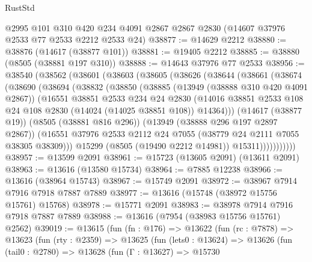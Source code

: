 \begin{lexlean}{RustStd}
\begin{coremodule}
    @2995
    @101
    @310
    @420
    @234
    @4091
    @2867
    @2867
    @2830
    (@14607 @37976 @2533 @77 @2533 @2212 @2533 @24)
@38877 := @14629 @2212
@38880 := @38876 (@14617 (@38877 @101))
@38881 := @19405 @2212
@38885 := @38880 (@8505 (@38881 @197 @310))
@38888 := @14643 @37976 @77 @2533
@38956 := @38540
    (@38562
      (@38601
        (@38603
          (@38605
            (@38626
              (@38644
                (@38661
                  (@38674
                    (@38690
                      (@38694
                        (@38832
                          (@38850
                            (@38885
                              (@13949 (@38888 @310 @420 @4091 @2867))
                              (@16551
                                @38851
                                @2533
                                @234
                                @24
                                @2830
                                (@14016
                                  @38851
                                  @2533
                                  @108
                                  @24
                                  @108
                                  @2830
                                  (@14024 (@14025 @38851 @108))
                                  @14364)))
                            (@14617 (@38877 @19))
                            (@8505 (@38881 @816 @296))
                            (@13949 (@38888 @296 @197 @2897 @2867))
                            (@16551
                              @37976
                              @2533
                              @2112
                              @24
                              @7055
                              (@38779 @24 @2111 @7055 @38305 @38309)))
                          @15299
                          (@8505 (@19490 @2212 @14981))
                          @15311)))))))))))
@38957 := @13599 @2091
@38961 := @15723 (@13605 @2091) (@13611 @2091)
@38963 := @13616 (@13580 @15734)
@38964 := @7885 @12238
@38966 := @13616 (@38964 @15743)
@38967 := @15749 @2091
@38972 := @38967 @7914 @7916 @7918 @7887 @7889
@38977 := @13616 (@15748 (@38972 @15756 @15761) @15768)
@38978 := @15771 @2091
@38983 := @38978 @7914 @7916 @7918 @7887 @7889
@38988 := @13616 (@7954 (@38983 @15756 @15761) @2562)
@39019 := @13615
    (fun (fn : @176) =>
    @13622
      (fun (rc : @7878) =>
      @13623
        (fun (rty : @2359) =>
        @13625
          (fun (lets0 : @13624) =>
          @13626
            (fun (tail0 : @2780) =>
            @13628
              (fun (Γ : @13627) =>
              @15730

\end{coremodule}
\end{lexlean}
